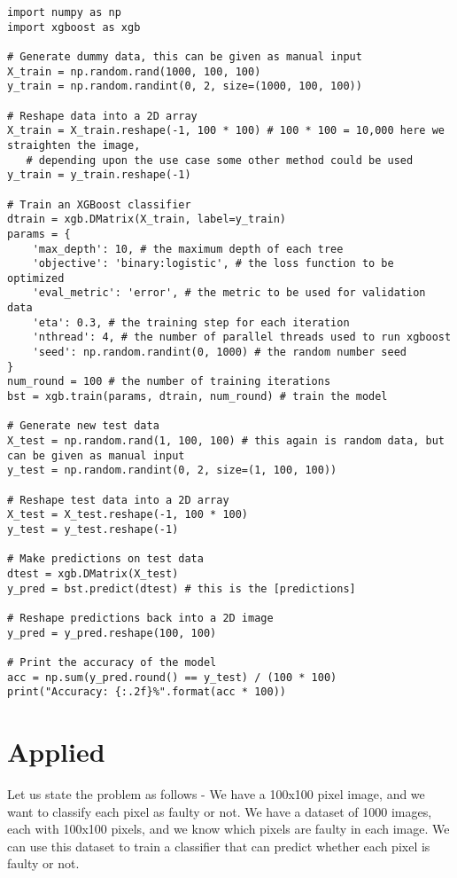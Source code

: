 \documentclass[12pt]{article}
\numberwithin{equation}{section}
\begin{document}
\begin{verbatim}
import numpy as np
import xgboost as xgb

# Generate dummy data, this can be given as manual input
X_train = np.random.rand(1000, 100, 100)
y_train = np.random.randint(0, 2, size=(1000, 100, 100))

# Reshape data into a 2D array
X_train = X_train.reshape(-1, 100 * 100) # 100 * 100 = 10,000 here we straighten the image,
   # depending upon the use case some other method could be used
y_train = y_train.reshape(-1)

# Train an XGBoost classifier
dtrain = xgb.DMatrix(X_train, label=y_train)
params = {
    'max_depth': 10, # the maximum depth of each tree
    'objective': 'binary:logistic', # the loss function to be optimized
    'eval_metric': 'error', # the metric to be used for validation data
    'eta': 0.3, # the training step for each iteration
    'nthread': 4, # the number of parallel threads used to run xgboost
    'seed': np.random.randint(0, 1000) # the random number seed
}
num_round = 100 # the number of training iterations
bst = xgb.train(params, dtrain, num_round) # train the model

# Generate new test data
X_test = np.random.rand(1, 100, 100) # this again is random data, but can be given as manual input
y_test = np.random.randint(0, 2, size=(1, 100, 100))

# Reshape test data into a 2D array
X_test = X_test.reshape(-1, 100 * 100)
y_test = y_test.reshape(-1)

# Make predictions on test data
dtest = xgb.DMatrix(X_test)
y_pred = bst.predict(dtest) # this is the [predictions]

# Reshape predictions back into a 2D image
y_pred = y_pred.reshape(100, 100)

# Print the accuracy of the model
acc = np.sum(y_pred.round() == y_test) / (100 * 100)
print("Accuracy: {:.2f}%".format(acc * 100))
\end{verbatim}

\section{Applied}
Let us state the problem as follows - We have a 100x100 pixel image, and we want to classify each pixel as faulty or not. We have a dataset of 1000 images, each with 100x100 pixels, and we know which pixels are faulty in each image. We can use this dataset to train a classifier that can predict whether each pixel is faulty or not.
\end{document}
